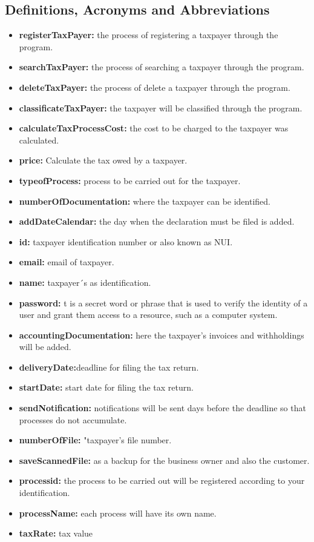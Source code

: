 \documentclass[12pt,a4paper, twosite]{article}
\begin{document}
\subsection{Definitions, Acronyms and Abbreviations}
\label{sec:orgb158e36}
\begin{itemize}
    \item \textbf{registerTaxPayer:} the process of registering a taxpayer through the program.
    \item \textbf{searchTaxPayer:} the process of searching a taxpayer through the program.
    \item \textbf{deleteTaxPayer:} the process of delete a taxpayer through the program.
    \item \textbf{classificateTaxPayer:} the taxpayer will be classified through the program.
    \item \textbf{calculateTaxProcessCost:} the cost to be charged to the taxpayer was calculated.
    \item \textbf{price:} Calculate the tax owed by a taxpayer.
    \item \textbf{typeofProcess:} process to be carried out for the taxpayer.
    \item \textbf{numberOfDocumentation:} where the taxpayer can be identified.
    \item \textbf{addDateCalendar:} the day when the declaration must be filed is added.
    \item \textbf{id:} taxpayer identification number or also known as NUI.
    \item \textbf{email:} email of taxpayer.
    \item \textbf{name:} taxpayer´s as identification.
    \item \textbf{password:} t is a secret word or phrase that is used to verify the identity of a user and grant them access to a resource, such as a computer system.
    \item \textbf{accountingDocumentation:} here the taxpayer's invoices and withholdings will be added.
    \item \textbf{deliveryDate:}deadline for filing the tax return.
    \item \textbf{startDate:} start date for filing the tax return.
    \item \textbf{sendNotification:} notifications will be sent days before the deadline so that processes do not accumulate.
    \item \textbf{numberOfFile:} "taxpayer's file number.
    \item \textbf{saveScannedFile:} as a backup for the business owner and also the customer.
    \item \textbf{processid:} the process to be carried out will be registered according to your identification.
    \item \textbf{processName:} each process will have its own name.
    \item \textbf{taxRate:} tax value
\end{itemize}
\end{document}
